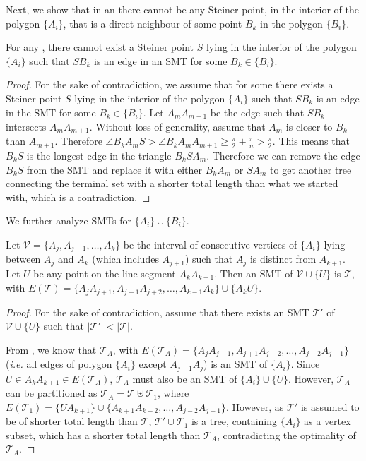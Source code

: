 Next, we show that in an \smtpoly there cannot be any Steiner point, in the interior of the polygon $\{A_i\}$, that is a direct neighbour of some point $B_k$ in the polygon $\{B_i\}$.

\begin{observation} \label{no_in_to_B}
    For any \smtpoly, there cannot exist a Steiner point $S$ lying in the interior of the polygon $\{A_i\}$ such that $SB_k$ is an edge in an SMT for some $B_k \in \{B_i\}$. 
\end{observation}

\begin{proof}
    For the sake of contradiction, we assume that for some \smtpoly there exists a Steiner point $S$ lying in the interior of the polygon $\{A_i\}$ such that $SB_k$ is an edge in the SMT for some $B_k \in \{B_i\}$. Let $A_mA_{m+1}$ be the edge such that $SB_k$ intersects $A_mA_{m+1}$. Without loss of generality, assume that $A_m$ is closer to $B_k$ than $A_{m+1}$. Therefore $\angle B_kA_mS > \angle B_kA_mA_{m+1} \ge \frac{\pi}{2} + \frac{\pi}{n} > \frac{\pi}{2}$. This means that $B_kS$ is the longest edge in the triangle $B_kSA_m$. Therefore we can remove the edge $B_kS$ from the SMT and replace it with either $B_kA_m$ or $SA_m$ to get another tree connecting the terminal set with a shorter total length than what we started with, which is a contradiction. 
\end{proof}

We further analyze SMTs for $\{A_i\}\cup \{B_i\}$.

\begin{observation} \label{subchain-smt}
    Let $\mathcal V = \{A_j, A_{j + 1}, \ldots, A_k\}$ be the interval of consecutive vertices of $\{A_i\}$ lying between $A_j$ and $A_k$ (which includes $A_{j + 1}$) such that $A_j$ is distinct from $A_{k + 1}$. Let $U$ be any point on the line segment $A_kA_{k+1}$. Then an SMT of $\mathcal V \cup \{U\}$ is $\mathcal T$, with $E(\mathcal T) = \{A_jA_{j+1}, A_{j+1}A_{j+2}, \ldots, A_{k-1}A_k\} \cup \{A_kU\}$. 
\end{observation}
\begin{proof}
    For the sake of contradiction, assume that there exists an SMT $\mathcal T'$ of $\mathcal V \cup \{U\}$ such that $|\mathcal T'| < |\mathcal T|$.  
    
    From \cite{du1987steiner}, we know that $\mathcal T_A$, with $E(\mathcal T_A) = \{A_jA_{j+1}, A_{j+1}A_{j+2}, \ldots, A_{j-2}A_{j-1}\}$ (\textit{i.e.} all edges of polygon $\{A_i\}$ except $A_{j-1}A_j$) is an SMT of $\{A_i\}$. Since $U \in A_kA_{k+1} \in E(\mathcal T_A)$, $\mathcal T_A$ must also be an SMT of $\{A_i\} \cup \{U\}$. However, $\mathcal T_A$ can be partitioned as $\mathcal T_A = \mathcal T \uplus \mathcal T_1$, where $E(\mathcal T_1) = \{UA_{k+1}\} \cup \{A_{k+1}A_{k+2}, \ldots, A_{j-2}A_{j-1}\}$.
    However, as $\mathcal T'$ is assumed to be of shorter total length than $\mathcal T$, $\mathcal T' \cup \mathcal T_1$ is a tree, containing $\{A_i\}$ as a vertex subset, which has a shorter total length than $\mathcal T_A$, contradicting the optimality of $\mathcal T_A$.
\end{proof}


